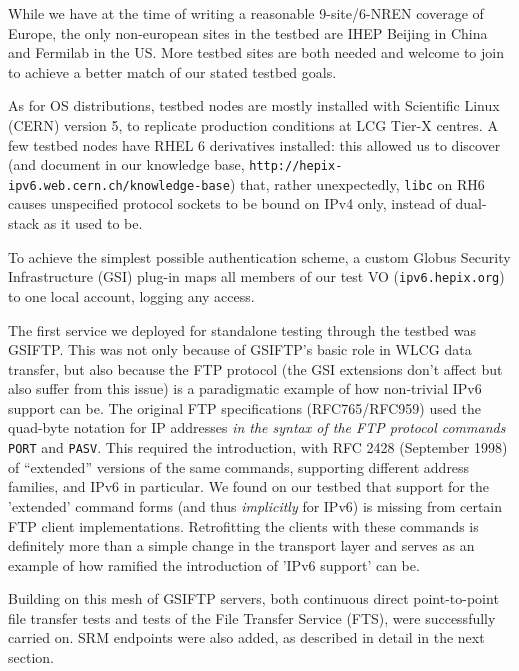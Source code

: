 While we have at the time of writing a reasonable
9-site/6-NREN coverage of Europe, the only non-european sites in the testbed
are IHEP Beijing in China and Fermilab in the US. More testbed sites are both needed and welcome to join 
to achieve a better match of our stated testbed goals.
\par
As for OS distributions, testbed nodes are mostly installed with 
Scientific Linux (CERN) version 5,
to replicate production conditions at LCG Tier-X centres. A few testbed nodes
have RHEL 6 derivatives installed: this allowed us to discover 
(and document in our knowledge base, {\tt http://hepix-ipv6.web.cern.ch/knowledge-base})
that, rather unexpectedly, {\tt libc} on RH6 causes unspecified 
protocol sockets to be bound on IPv4 only, instead of dual-stack 
as it used to be.
\par
To achieve the simplest possible authentication scheme, a custom Globus
Security Infrastructure (GSI)
plug-in maps all members of our test VO ({\tt ipv6.hepix.org}) to one
local account, logging any access. 
\par
The first service we deployed for standalone testing through the testbed was
GSIFTP. This was not only because of GSIFTP's basic role in WLCG data
transfer, but also because the FTP protocol (the GSI extensions don't 
affect but also suffer from this issue) is a paradigmatic example of 
how non-trivial IPv6 support can be. The original FTP specifications 
(RFC765/RFC959) used the quad-byte notation for IP addresses 
{\em in the syntax of the FTP protocol commands} {\tt PORT} and {\tt PASV}.
This required the introduction, with RFC 2428 (September 1998) of
``extended'' versions of the same commands, supporting different address
families, and IPv6 in particular. We found on our testbed that support for 
the 'extended' command forms (and thus {\em implicitly} for IPv6)
is missing from certain FTP client implementations. Retrofitting the
clients with these commands is definitely more than a simple change in
the transport layer and serves as an example of how ramified the
introduction of 'IPv6 support' can be.
\par
Building on this mesh of GSIFTP servers, both continuous direct point-to-point 
file transfer tests and tests of the File Transfer Service 
(FTS), were successfully carried on. SRM endpoints
were also added, as described in detail in the next section.
